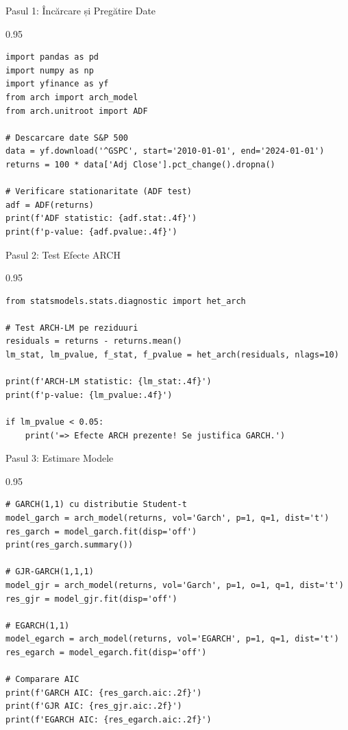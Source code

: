 \documentclass[9pt, aspectratio=169, t]{beamer}
\begin{document}
\begin{frame}[fragile]{Pasul 1: Încărcare și Pregătire Date}
    \begin{cminipage}{0.95\textwidth}
\begin{lstlisting}
import pandas as pd
import numpy as np
import yfinance as yf
from arch import arch_model
from arch.unitroot import ADF

# Descarcare date S&P 500
data = yf.download('^GSPC', start='2010-01-01', end='2024-01-01')
returns = 100 * data['Adj Close'].pct_change().dropna()

# Verificare stationaritate (ADF test)
adf = ADF(returns)
print(f'ADF statistic: {adf.stat:.4f}')
print(f'p-value: {adf.pvalue:.4f}')
\end{lstlisting}
    \end{cminipage}
\end{frame}

\begin{frame}[fragile]{Pasul 2: Test Efecte ARCH}
    \begin{cminipage}{0.95\textwidth}
\begin{lstlisting}
from statsmodels.stats.diagnostic import het_arch

# Test ARCH-LM pe reziduuri
residuals = returns - returns.mean()
lm_stat, lm_pvalue, f_stat, f_pvalue = het_arch(residuals, nlags=10)

print(f'ARCH-LM statistic: {lm_stat:.4f}')
print(f'p-value: {lm_pvalue:.4f}')

if lm_pvalue < 0.05:
    print('=> Efecte ARCH prezente! Se justifica GARCH.')
\end{lstlisting}
    \end{cminipage}
\end{frame}

\begin{frame}[fragile]{Pasul 3: Estimare Modele}
    \begin{cminipage}{0.95\textwidth}
\begin{lstlisting}
# GARCH(1,1) cu distributie Student-t
model_garch = arch_model(returns, vol='Garch', p=1, q=1, dist='t')
res_garch = model_garch.fit(disp='off')
print(res_garch.summary())

# GJR-GARCH(1,1,1)
model_gjr = arch_model(returns, vol='Garch', p=1, o=1, q=1, dist='t')
res_gjr = model_gjr.fit(disp='off')

# EGARCH(1,1)
model_egarch = arch_model(returns, vol='EGARCH', p=1, q=1, dist='t')
res_egarch = model_egarch.fit(disp='off')

# Comparare AIC
print(f'GARCH AIC: {res_garch.aic:.2f}')
print(f'GJR AIC: {res_gjr.aic:.2f}')
print(f'EGARCH AIC: {res_egarch.aic:.2f}')
\end{lstlisting}
    \end{cminipage}
\end{frame}
\end{document}
